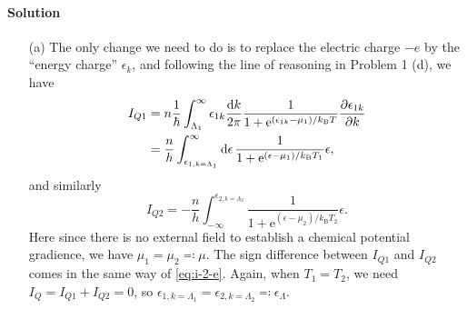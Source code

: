 \documentclass[hyperref, a4paper]{article}
\newcommand*{\ee}{\mathrm{e}}
\begin{document}
\paragraph{Solution} \begin{itemize}
\item[(a)] The only change we need to do is to replace the electric charge $-e$ 
by the ``energy charge'' $\epsilon_{k}$, and following the line of reasoning in Problem 1 (d), 
we have 
\begin{equation}
    \begin{aligned}
        I_{Q1} &= n \frac{1}{\hbar} \int_{\Lambda_1}^{\infty} \epsilon_{1k}
        \frac{\dd{k}}{2\pi} \frac{1}{1 + \ee^{(\epsilon_{1k} - \mu_1) / k_{\text{B}} T}} \pdv{\epsilon_{1k}}{k}  \\
        &= \frac{n}{h} \int^\infty_{\epsilon_{1, k = \Lambda_1}} \dd{\epsilon}  
        \frac{1}{1 + \ee^{(\epsilon - \mu_1) / k_{\text{B}} T_1}}
        \epsilon,
    \end{aligned}
\end{equation}
and similarly 
\begin{equation}
    I_{Q2} = - \frac{n}{h} \int_{-\infty}^{\epsilon_{2, k = \Lambda_2}} 
    \frac{1}{1 + \ee^{(\epsilon - \mu_2) / k_{\text{B}} T_2}}
    \epsilon.
\end{equation}
Here since there is no external field to establish a chemical potential gradience,
we have $\mu_1 = \mu_2 \eqqcolon \mu$.
The sign difference between $I_{Q1}$ and $I_{Q2}$ comes in the same way of \eqref{eq:i-2-e}.
Again, when $T_1 = T_2$, 
we need $I_Q = I_{Q1} + I_{Q2} = 0$, 
so $\epsilon_{1, k=\Lambda_1} = \epsilon_{2, k=\Lambda_2} \eqqcolon \epsilon_\Lambda$.


\end{itemize}
\end{document}
